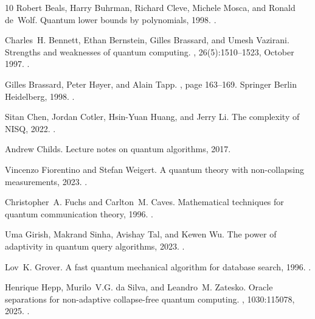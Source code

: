 \documentclass[10pt,a4paper]{article}
\begin{document}
\begin{thebibliography}{10}
Robert Beals, Harry Buhrman, Richard Cleve, Michele Mosca, and Ronald de~Wolf.
\newblock Quantum lower bounds by polynomials, 1998.
\newblock \href {https://arxiv.org/abs/quant-ph/9802049} {}.

Charles~H. Bennett, Ethan Bernstein, Gilles Brassard, and Umesh Vazirani.
\newblock Strengths and weaknesses of quantum computing.
, 26(5):1510–1523, October 1997.
\newblock \href {https://doi.org/10.1137/s0097539796300933} {}.

Gilles Brassard, Peter Høyer, and Alain Tapp.
, page 163–169.
\newblock Springer Berlin Heidelberg, 1998.
\newblock \href {https://doi.org/10.1007/bfb0054319} {}.

Sitan Chen, Jordan Cotler, Hsin-Yuan Huang, and Jerry Li.
\newblock The complexity of {NISQ}, 2022.
\newblock \href {https://arxiv.org/abs/2210.07234} {}.

Andrew Childs.
\newblock Lecture notes on quantum algorithms, 2017.

Vincenzo Fiorentino and Stefan Weigert.
\newblock A quantum theory with non-collapsing measurements, 2023.
\newblock \href {https://arxiv.org/abs/2303.13411} {}.

Christopher~A. Fuchs and Carlton~M. Caves.
\newblock Mathematical techniques for quantum communication theory, 1996.
\newblock \href {https://arxiv.org/abs/quant-ph/9604001} {}.

Uma Girish, Makrand Sinha, Avishay Tal, and Kewen Wu.
\newblock The power of adaptivity in quantum query algorithms, 2023.
\newblock \href {https://arxiv.org/abs/2311.16057} {}.

Lov~K. Grover.
\newblock A fast quantum mechanical algorithm for database search, 1996.
\newblock \href {https://arxiv.org/abs/quant-ph/9605043} {}.

Henrique Hepp, Murilo~V.G. {da Silva}, and Leandro~M. Zatesko.
\newblock Oracle separations for non-adaptive collapse-free quantum computing.
, 1030:115078, 2025.
\newblock \href {https://doi.org/10.1016/j.tcs.2025.115078} {}.


\end{thebibliography}
\end{document}

